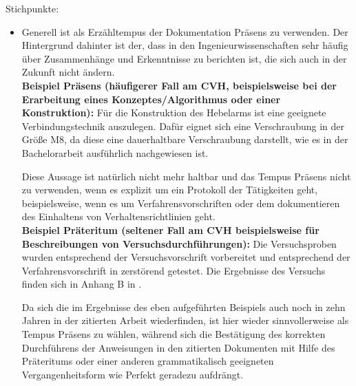Stichpunkte: 
\begin{itemize}
  \item
    Generell ist als Erzähltempus der Dokumentation \glqq{}Präsens\grqq{} zu verwenden. Der Hintergrund dahinter ist der, dass in den Ingenieurwissenschaften sehr häufig über Zusammenhänge und Erkenntnisse zu berichten ist, die sich auch in der Zukunft nicht ändern. \\
    \textbf{Beispiel Präsens (häufigerer Fall am CVH, beispielsweise bei der Erarbeitung eines Konzeptes/Algorithmus oder einer Konstruktion):} Für die Konstruktion des Hebelarms ist eine geeignete Verbindungstechnik auszulegen. Dafür eignet sich eine Verschraubung in der Größe M8, da diese eine dauerhaltbare Verschraubung darstellt, wie es in der Bachelorarbeit \citep{musterbachelorarbeit2015} ausführlich nachgewiesen ist. 
    
    Diese Aussage ist natürlich nicht mehr haltbar und das Tempus Präsens nicht zu verwenden, wenn es explizit um ein Protokoll der Tätigkeiten geht, beispielsweise, wenn es  um Verfahrensvorschriften oder dem dokumentieren des Einhaltens von Verhaltensrichtlinien geht. \\
    \textbf{Beispiel Präteritum (seltener Fall am CVH beispielsweise für Beschreibungen von Versuchsdurchführungen):} Die Versuchsproben wurden entsprechend der Versuchsvorschrift \citep[Abschnitt 3]{DIN_EN_1995_1_1} vorbereitet  und entsprechend der Verfahrensvorschrift in \citep[Abschnitt 4]{musterhandbuch2012} zerstörend getestet. Die Ergebnisse des Versuchs finden sich in Anhang B in \citep{musterbachelorarbeit2015} . 
    
    Da sich die im Ergebnisse des eben aufgeführten Beispiels auch noch in zehn Jahren in der zitierten Arbeit wiederfinden, ist hier wieder sinnvollerweise als Tempus \glqq{}Präsens\grqq{} zu wählen, während sich die Bestätigung des korrekten Durchführens der Anweisungen in den zitierten Dokumenten mit Hilfe des \glqq{}Präteritums\grqq{} oder einer anderen grammatikalisch geeigneten Vergangenheitsform wie \glqq{}Perfekt\grqq{} geradezu aufdrängt. 
    

\end{itemize}
